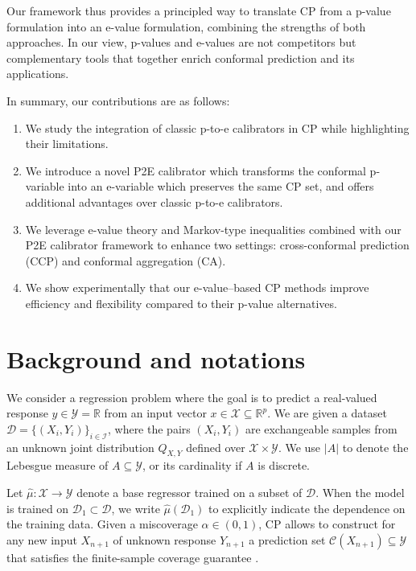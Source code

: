 \documentclass{article}
\theoremstyle{plain}
\theoremstyle{definition}
\theoremstyle{remark}
\begin{document}
Our framework thus provides a principled way to translate CP from a p-value formulation into an e-value formulation, combining the strengths of both approaches. In our view, p-values and e-values are not competitors but complementary tools that together enrich conformal prediction and its applications.  

In summary, our contributions are as follows:
\begin{enumerate}
\item We study the integration of classic p-to-e calibrators in CP while highlighting their limitations.
    \item We introduce a novel P2E calibrator which transforms the conformal p-variable into an e-variable which preserves the same CP set, and offers additional advantages over classic p-to-e calibrators. 

    \item We leverage e-value theory and Markov-type inequalities combined with our P2E calibrator framework to enhance two settings: cross-conformal prediction (CCP) and conformal aggregation (CA). 

     
    \item We show experimentally that our e-value–based CP methods improve efficiency and flexibility compared to their p-value alternatives.  
\end{enumerate}



\section{Background and notations}

We consider a regression problem where the goal is to predict a real-valued response 
\(y \in \mathcal{Y} = \mathbb{R}\) from an input vector \(x \in \mathcal{X} \subseteq \mathbb{R}^p\). 
We are given a dataset 
\(\mathcal{D} = \{(X_i, Y_i)\}_{i \in \mathcal{I}}\), 
where the pairs \((X_i, Y_i)\) are exchangeable samples from an unknown joint distribution 
\(Q_{X,Y}\) defined over \(\mathcal{X} \times \mathcal{Y}\). We use $|A|$ to denote the Lebesgue measure of $A \subseteq \mathcal{Y}$, or its cardinality if $A$ is discrete. 

Let \(\hat{\mu}:\mathcal{X}\to\mathcal{Y}\) denote a base regressor trained on a subset of \(\mathcal{D}\). 
When the model is trained on  \(\mathcal{D}_1 \subset \mathcal{D}\), we write \(\hat{\mu}(\mathcal{D}_1)\) 
to explicitly indicate the dependence on the training data. Given a miscoverage $\alpha\in(0,1)$, CP allows to construct for any new input \(X_{n+1}\) of unknown response \(Y_{n+1}\) 
a prediction set \(\mathcal{C}(X_{n+1}) \subseteq \mathcal{Y}\) that satisfies the finite-sample coverage guarantee \citep{vovk2005algorithmic}. 
\end{document}
